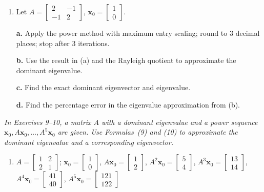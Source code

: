 \documentclass{article}
\begin{document}
\begin{enumerate}
  \item[7.] Let $A = \begin{bmatrix}2&-1\\-1&2\end{bmatrix}$,
        $\mathbf{x}_0=\begin{bmatrix}1\\0\end{bmatrix}$.

  \textbf{a.} Apply the power method with maximum entry scaling; round to 3 decimal places;
  stop after 3 iterations.

  \textbf{b.} Use the result in (a) and the Rayleigh quotient to approximate the dominant
  eigenvalue.

  \textbf{c.} Find the exact dominant eigenvector and eigenvalue.

  \textbf{d.} Find the percentage error in the eigenvalue approximation from (b).

\end{enumerate}

\noindent\textit{In Exercises 9--10, a matrix $A$ with a dominant eigenvalue and a power
sequence $\mathbf{x}_0, A\mathbf{x}_0,\ldots,A^5\mathbf{x}_0$ are given. Use
Formulas~(9) and (10) to approximate the dominant eigenvalue and a corresponding
eigenvector.}

\begin{enumerate}
  \item[9.] $A = \begin{bmatrix}1&2\\2&1\end{bmatrix}$;\quad
        $\mathbf{x}_0=\begin{bmatrix}1\\0\end{bmatrix}$,\;
        $A\mathbf{x}_0=\begin{bmatrix}1\\2\end{bmatrix}$,\;
        $A^2\mathbf{x}_0=\begin{bmatrix}5\\4\end{bmatrix}$,\;
        $A^3\mathbf{x}_0=\begin{bmatrix}13\\14\end{bmatrix}$,\;
        $A^4\mathbf{x}_0=\begin{bmatrix}41\\40\end{bmatrix}$,\;
        $A^5\mathbf{x}_0=\begin{bmatrix}121\\122\end{bmatrix}$

\end{enumerate}
\end{document}

